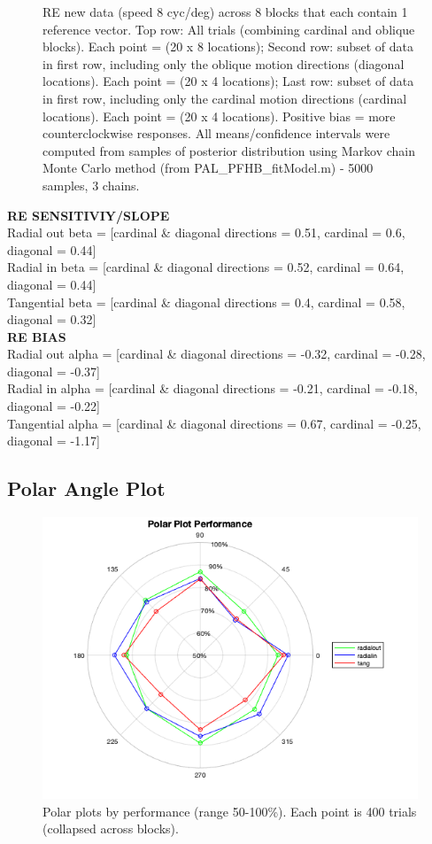 \documentclass[11pt]{article} %
\begin{document}
\begin{figure}[H]
\caption{RE new data (speed 8 cyc/deg) across 8 blocks that each contain 1 reference vector. Top row: All trials (combining cardinal and oblique blocks). Each point = (20 x 8 locations); Second row: subset of data in first row, including only the oblique motion directions (diagonal locations). Each point = (20 x 4 locations); Last row: subset of data in first row, including only the cardinal motion directions (cardinal locations). Each point = (20 x 4 locations). Positive bias = more counterclockwise responses. All means/confidence intervals were computed from samples of posterior distribution using Markov chain Monte Carlo method (from PAL\_PFHB\_fitModel.m) - 5000 samples, 3 chains.}
\end{figure}

\textbf{RE SENSITIVIY/SLOPE}
\\
Radial out beta = [cardinal \& diagonal directions =  0.51, cardinal = 0.6, diagonal = 0.44]
\\
Radial in beta = [cardinal \& diagonal directions =  0.52, cardinal = 0.64, diagonal = 0.44]
\\
Tangential beta = [cardinal \& diagonal directions =  0.4, cardinal = 0.58, diagonal = 0.32]
\\
\textbf{RE BIAS}
\\
Radial out alpha = [cardinal \& diagonal directions =  -0.32, cardinal = -0.28, diagonal = -0.37]
\\
Radial in alpha = [cardinal \& diagonal directions =  -0.21, cardinal = -0.18, diagonal = -0.22]
\\
Tangential alpha = [cardinal \& diagonal directions =  0.67, cardinal = -0.25, diagonal = -1.17]

\newpage
\subsection{Polar Angle Plot}
\begin{figure}[H]
\centering %
\includegraphics[scale=.5]{Images/performance_polarplot.png}
\caption{Polar plots by performance (range 50-100\%). Each point is 400 trials (collapsed across blocks).}
\end{figure}
\end{document}
